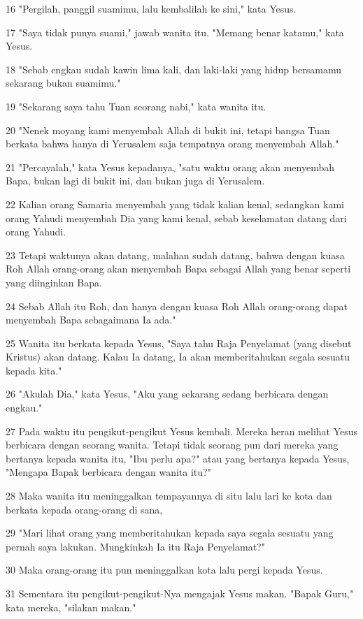 \par 16 "Pergilah, panggil suamimu, lalu kembalilah ke sini," kata Yesus.
\par 17 "Saya tidak punya suami," jawab wanita itu. "Memang benar katamu," kata Yesus.
\par 18 "Sebab engkau sudah kawin lima kali, dan laki-laki yang hidup bersamamu sekarang bukan suamimu."
\par 19 "Sekarang saya tahu Tuan seorang nabi," kata wanita itu.
\par 20 "Nenek moyang kami menyembah Allah di bukit ini, tetapi bangsa Tuan berkata bahwa hanya di Yerusalem saja tempatnya orang menyembah Allah."
\par 21 "Percayalah," kata Yesus kepadanya, "satu waktu orang akan menyembah Bapa, bukan lagi di bukit ini, dan bukan juga di Yerusalem.
\par 22 Kalian orang Samaria menyembah yang tidak kalian kenal, sedangkan kami orang Yahudi menyembah Dia yang kami kenal, sebab keselamatan datang dari orang Yahudi.
\par 23 Tetapi waktunya akan datang, malahan sudah datang, bahwa dengan kuasa Roh Allah orang-orang akan menyembah Bapa sebagai Allah yang benar seperti yang diinginkan Bapa.
\par 24 Sebab Allah itu Roh, dan hanya dengan kuasa Roh Allah orang-orang dapat menyembah Bapa sebagaimana Ia ada."
\par 25 Wanita itu berkata kepada Yesus, "Saya tahu Raja Penyelamat (yang disebut Kristus) akan datang. Kalau Ia datang, Ia akan memberitahukan segala sesuatu kepada kita."
\par 26 "Akulah Dia," kata Yesus, "Aku yang sekarang sedang berbicara dengan engkau."
\par 27 Pada waktu itu pengikut-pengikut Yesus kembali. Mereka heran melihat Yesus berbicara dengan seorang wanita. Tetapi tidak seorang pun dari mereka yang bertanya kepada wanita itu, "Ibu perlu apa?" atau yang bertanya kepada Yesus, "Mengapa Bapak berbicara dengan wanita itu?"
\par 28 Maka wanita itu meninggalkan tempayannya di situ lalu lari ke kota dan berkata kepada orang-orang di sana,
\par 29 "Mari lihat orang yang memberitahukan kepada saya segala sesuatu yang pernah saya lakukan. Mungkinkah Ia itu Raja Penyelamat?"
\par 30 Maka orang-orang itu pun meninggalkan kota lalu pergi kepada Yesus.
\par 31 Sementara itu pengikut-pengikut-Nya mengajak Yesus makan. "Bapak Guru," kata mereka, "silakan makan."

